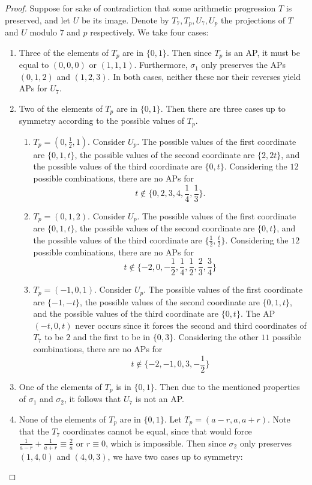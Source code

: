 \documentclass[12pt]{amsart}
\theoremstyle{definition}
\theoremstyle{remark}
\begin{document}
\begin{proof}
Suppose for sake of contradiction that some arithmetic progression $T$ is preserved, and let $U$ be its image. Denote by $T_7, T_p, U_7, U_p$ the projections of $T$ and $U$ modulo $7$ and $p$ respectively. We take four cases:
\begin{enumerate}
\item Three of the elements of $T_p$ are in $\{0, 1\}$. Then since $T_p$ is an AP, it must be equal to $(0, 0, 0)$ or $(1, 1, 1)$. Furthermore, $\sigma_1$ only preserves the APs $(0, 1, 2)$ and $(1, 2, 3)$. In both cases, neither these nor their reverses yield APs for $U_7$. 
\item Two of the elements of $T_p$ are in $\{0, 1\}$. Then there are three cases up to symmetry according to the possible values of $T_p$. 
\begin{enumerate}
\item $T_p=(0, \frac{1}{2}, 1)$. Consider $U_p$. The possible values of the first coordinate are $\{0, 1, t\}$, the possible values of the second coordinate are $\{2, 2t\}$, and the possible values of the third coordinate are $\{0, t\}$. Considering the $12$ possible combinations, there are no APs for
\[t\notin\{0, 2, 3, 4, \frac{1}{4}, \frac{1}{3}\}.\] 
\item  $T_p=(0, 1, 2)$. Consider $U_p$. The possible values of the first coordinate are $\{0, 1, t\}$, the possible values of the second coordinate are $\{0, t\}$, and the possible values of the third coordinate are $\{\frac{1}{2}, \frac{t}{2}\}$. Considering the $12$ possible combinations, there are no APs for
\[t\notin\{-2, 0, -\frac{1}{2}, \frac{1}{4}, \frac{1}{2}, \frac{2}{3}, \frac{3}{4}\}\]
\item $T_p=(-1, 0, 1)$. Consider $U_p$. The possible values of the first coordinate are $\{-1, -t\}$, the possible values of the second coordinate are $\{0, 1, t\}$, and the possible values of the third coordinate are $\{0, t\}$. The AP $(-t, 0, t)$ never occurs since it forces the second and third coordinates of $T_7$ to be $2$ and the first to be in $\{0, 3\}$. Considering the other $11$ possible combinations, there are no APs for
\[t\notin\{-2, -1, 0, 3, -\frac{1}{2}\}\]
\end{enumerate}
\item One of the elements of $T_p$ is in $\{0, 1\}$. Then due to the mentioned properties of $\sigma_1$ and $\sigma_2$, it follows that $U_7$ is not an AP. 
\item None of the elements of $T_p$ are in $\{0, 1\}$. Let $T_p=(a-r, a, a+r)$. Note that the $T_7$ coordinates cannot be equal, since that would force $\frac{1}{a-r}+\frac{1}{a+r}\equiv \frac{2}{a}$ or $r\equiv 0$, which is impossible. Then since $\sigma_2$ only preserves $(1, 4, 0)$ and $(4, 0, 3)$, we have two cases up to symmetry:

\end{enumerate}
\end{proof}
\end{document}
